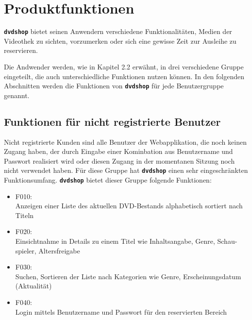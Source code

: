 \documentclass[12pt,oneside,a4paper,bibtotoc,liststotoc,pointlessnumbers]{scrartcl}
\begin{document}
\newpage
\section{Produktfunktionen}
\texttt{\textbf{dvdshop}} bietet seinen Anwendern verschiedene Funktionalitäten, Medien der Videothek zu sichten, vorzumerken oder sich eine gewisse Zeit zur Ausleihe zu reservieren.\par
Die Andwender werden, wie in Kapitel 2.2 erwähnt, in drei verschiedene Gruppe eingeteilt, die auch unterschiedliche Funktionen nutzen können. In den folgenden Abschnitten werden die Funktionen von \texttt{\textbf{dvdshop}} für jede Benutzergruppe genannt.
\subsection{Funktionen für nicht registrierte Benutzer}
Nicht registrierte Kunden sind alle Benutzer der Webapplikation, die noch keinen Zugang haben, der durch Eingabe einer Kominbation aus Benutzername und Passwort realisiert wird oder diesen Zugang in der momentanen Sitzung noch nicht verwendet haben. Für diese Gruppe hat \texttt{\textbf{dvdshop}} einen sehr eingeschränkten Funktionsumfang. \texttt{\textbf{dvdshop}} bietet dieser Gruppe folgende Funktionen:
\begin{itemize}
\item F010: \\Anzeigen einer Liste des aktuellen DVD-Bestands alphabetisch sortiert nach Titeln
\item F020: \\ Einsichtnahme in Details zu einem Titel wie Inhaltsangabe, Genre, Schau-spieler, Altersfreigabe
\item F030: \\Suchen, Sortieren der Liste nach Kategorien wie Genre, Erscheinungsdatum (Aktualität)
\item F040: \\Login mittels Benutzername und Passwort für den reservierten Bereich
\end{itemize}
\newpage
\end{document}
